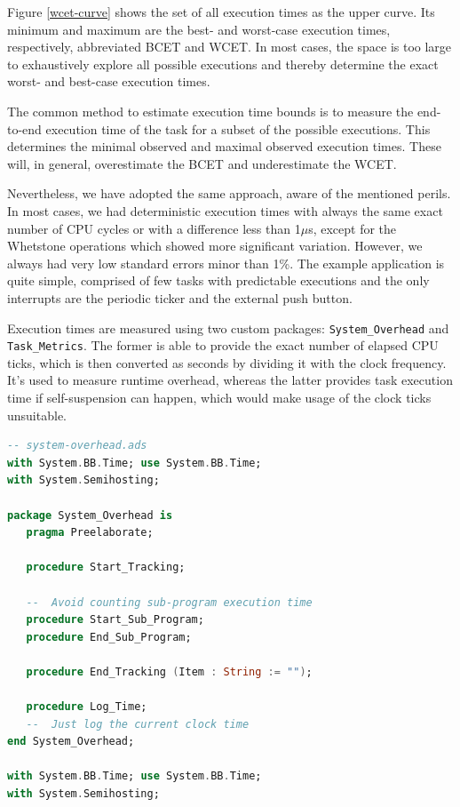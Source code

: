 \documentclass{article}
\begin{document}
Figure \ref{wcet-curve} shows the set of all execution times as the upper curve. Its minimum and maximum are the best- and worst-case execution times, respectively, abbreviated BCET and WCET. In most cases, the space is too large to exhaustively explore all possible executions and thereby determine the exact worst- and best-case execution times.

The common method to estimate execution time bounds is to measure the end-to-end execution time of the task for a subset of the possible executions. This determines the minimal observed and maximal observed execution times. These will, in general, overestimate the BCET and underestimate the WCET.

Nevertheless, we have adopted the same approach, aware of the mentioned perils. In most cases, we had deterministic execution times with always the same exact number of CPU cycles or with a difference less than 1$\mu$s, except for the Whetstone operations which showed more significant variation. However, we always had very low standard errors minor than 1\%. The example application is quite simple, comprised of few tasks with predictable executions and the only interrupts are the periodic ticker and the external push button.

Execution times are measured using two custom packages: \texttt{System\_Overhead} and \texttt{Task\_Metrics}. The former is able to provide the exact number of elapsed CPU ticks, which is then converted as seconds by dividing it with the clock frequency. It's used to measure runtime overhead, whereas the latter provides task execution time if self-suspension can happen, which would make usage of the clock ticks unsuitable.

\begin{lstlisting}[language=Ada]
-- system-overhead.ads
with System.BB.Time; use System.BB.Time;
with System.Semihosting;

package System_Overhead is
   pragma Preelaborate;

   procedure Start_Tracking;

   --  Avoid counting sub-program execution time
   procedure Start_Sub_Program;
   procedure End_Sub_Program;

   procedure End_Tracking (Item : String := "");

   procedure Log_Time;
   --  Just log the current clock time
end System_Overhead;

with System.BB.Time; use System.BB.Time;
with System.Semihosting;
\end{lstlisting}
\end{document}
